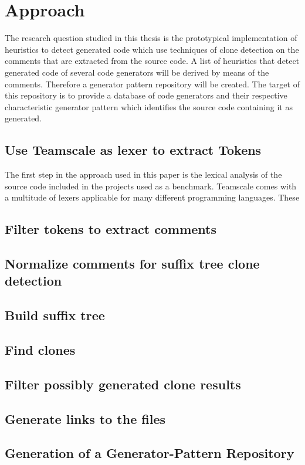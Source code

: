 
\chapter{Approach}\label{chapter:approach}
The research question studied in this thesis is the prototypical implementation of heuristics to detect generated code which use techniques of clone detection on the comments that are extracted from the source code. A list of heuristics that detect generated code of several code generators will be derived by means of the comments. Therefore a generator pattern repository will be created. The target of this repository is to provide a database of code generators and their respective characteristic generator pattern which identifies the source code containing it as generated.
\section{Use Teamscale as lexer to extract Tokens}
The first step in the approach used in this paper is the lexical analysis of the source code included in the projects used as a benchmark. Teamscale comes with a multitude of lexers applicable for many different programming languages. These
\section{Filter tokens to extract comments}
\section{Normalize comments for suffix tree clone detection}
\section{Build suffix tree}
\section{Find clones}
\section{Filter possibly generated clone results}
\section{Generate links to the files}
\section{Generation of a Generator-Pattern Repository}